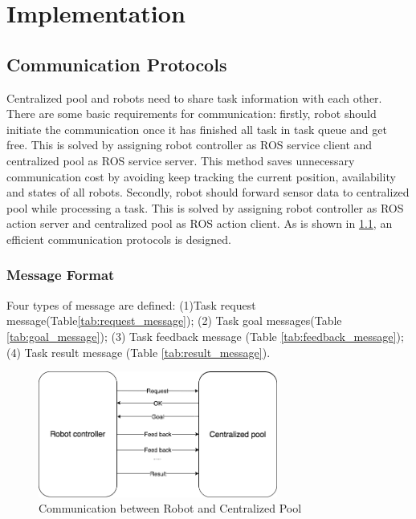 \chapter{Implementation}


\section{Communication Protocols}


Centralized pool and robots need to share task information with each other. There are some basic requirements for communication: firstly,
robot should initiate the communication once it has finished all task in task queue and get free. This is solved by assigning robot controller as ROS service client and centralized pool as ROS service server.
This method saves unnecessary communication cost by avoiding keep tracking the current position, availability and states of all robots.
Secondly, robot should forward sensor data to centralized pool while processing a task. This is solved by assigning robot controller as ROS action server and centralized pool as ROS action client.
As is shown in \ref{fig:comminication}, an efficient communication protocols is designed. 

\subsection{Message Format}
Four types of message are defined: 
(1)Task request message(Table\ref{tab:request_message}); (2) Task goal messages(Table \ref{tab:goal_message}); (3) Task feedback message (Table \ref{tab:feedback_message}); (4) Task result message (Table \ref{tab:result_message}). 

\begin{figure}[htbp]
    \centering
    \includegraphics[width = 0.7\textwidth]{content/images/ch4/robot_pool_comminication.drawio.png}
    \caption{Communication between Robot and Centralized Pool}
    \label{fig:comminication}
\end{figure}

